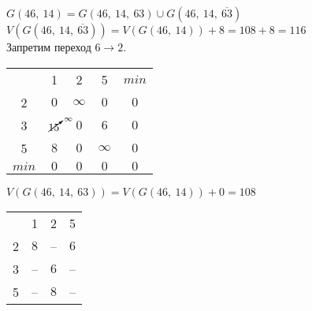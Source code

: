 \begin{itemize}
	$G(46,\ 14) = G(46,\ 14,\ 63) \cup G(46,\ 14,\ \overline{63})$\\
	$V(G(46,\ 14,\ \overline{63})) = V(G(46,\ 14)) + 8 = 108 + 8 = 116$\\
	Запретим переход $6 \rightarrow 2$.

	\begin{table}[H]
	\begin{center}
		\def\tabcolsep{18pt}
		\def\arraystretch{1.5}
		\fontsize{13}{14}\selectfont
		\begin{tabular}{|c||c|c|c||c|}
			\hline 
	  		& 1 & 2 & 5 & $min$\\ 
			\hhline{|=#=|=|=#=|} 
			2 & $0$ & $\infty$ & $0$ & $0$ \\ 
			\hline 
			3 & $\cancelto{\infty}{15}$ & $0$ & $6$ & $0$ \\ 
			\hline 
			5 & $8$ & $0$ & $\infty$ & $0$ \\
			\hhline{|=#=|=|=#=|}
			$min$ & $0$ & $0$ & $0$ & $0$ \\
			\hline
		\end{tabular}  
	\end{center}
	\end{table}

	$V(G(46,\ 14,\ 63)) = V(G(46,\ 14)) + 0 = 108$\\
	
\end{itemize}

\begin{table}[H]
\begin{center}
	\def\tabcolsep{18pt}
	\def\arraystretch{1.5}
	\fontsize{13}{14}\selectfont
	\begin{tabular}{|c||c|c|c|}
		\hline 
	  	& 1 & 2 & 5 \\ 
		\hhline{|=#=|=|=|} 
		2 & \cellcolor{pink} $8$ & -- & $6$ \\ 
		\hline 
		3 & -- & $6$ & -- \\ 
		\hline 
		5 & -- & \cellcolor{pink} $8$ & -- \\ 
		\hline 
	\end{tabular}  
\end{center}
\end{table}

